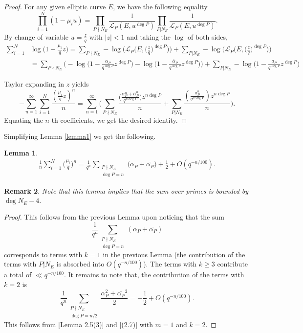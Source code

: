 \documentclass[12pt,reqno]{amsart}
\newcommand{\CL}{\mathcal{L}}
\newtheorem{lem}{Lemma}[subsection]
\newtheorem{rem}[lem]{Remark}
\begin{document}
\begin{proof}
    For any given elliptic curve $E$, we have the following equality
$$ 
\prod_{i=1}^{N} (1-\mu_i u) = \prod_{P \nmid N_E} \frac{1}{\mathcal{L}_P(E,u^{\deg P})} \prod_{P | N_E} \frac{1}{\mathcal{L}_P(E,u^{\deg P})}.
$$
By change of variable $u=\frac{z}{q}$ with $|z| < 1$ and taking the $\log$ of both sides, 
\begin{align*}
\sum\limits_{i=1}^{N} &\log \Big (1- \frac{\mu_i}{q} z \Big ) = \sum_{P \nmid N_E} -\log \Big (\CL_{P} \Big (E,\Big ( \frac{z}{q} \Big )^{\deg P} \Big ) \Big) + \sum_{P | N_E} - \log \Big (\CL_{P} \Big ( E, \Big( \frac{z}{q} \Big) ^{\deg P} \Big) \Big ) \\
&= \sum_{P \nmid N_E} \Big ( -\log \Big (1-\frac{\alpha_{P}}{q^{\deg P}} z^{\deg P} \Big ) - \log \Big ( 1-\frac{\overline{\alpha}_{P}}{q^{\deg P}} z^{\deg P} \Big) \Big) + \sum_{P | N_E} -\log \Big ( 1- \frac{a_P}{q^{\deg P}} z^{\deg P} \Big )
\end{align*}

Taylor expanding in $z$ yields
$$
- \sum\limits_{n=1}^{\infty} \sum\limits_{i=1}^{N} \frac{(\frac{\mu_i}{q} z)^n}{n} =   \sum\limits_{n=1}^{\infty} \Big ( \sum_{P \nmid N_E} \frac{ \Big ( \frac{\alpha_{P}^n + \overline{\alpha}_{P}^n}{q^{n\deg P}} \Big ) z^{n\deg P}} {n} + \sum_{P | N_E} \frac{ (\frac{a_{P}^n}{q^{n\deg P}}) z^{n\deg P}}{n} \Big ). 
$$
Equating the $n$-th coefficients, we get the desired identity.
\end{proof}

Simplifying Lemma \ref{lemma1} we get the following. 


\begin{lem}\label{bounding}
    \begin{align}\label{nthcoefficiets}
\frac{1}{n}\sum\limits_{i=1}^{N} \Big ( \frac{\mu_i}{q} \Big )^n =  \frac{1}{q^n} \sum_{\substack{P \nmid N_E \\ \deg P = n}} \Big (\alpha_P + \overline{\alpha_P} \Big ) + \frac{1}{2} + O(q^{-n / 100}).
\end{align}
\end{lem}
\begin{rem}
Note that this lemma implies that the sum over primes is bounded by $\deg N_E - 4.$
\end{rem}
\begin{proof}
This follows from the previous Lemma upon noticing that the sum 
$$
\frac{1}{q^n}\sum_{\substack{P \nmid N_E \\ \deg P = n}} (\alpha_P + \overline{\alpha_P})
$$
corresponds to terms with $k = 1$ in the previous Lemma (the contribution of the terms with $P | N_E$ is absorbed into $O(q^{-n/100})$). The terms with $k \geq 3$ contribute a total of $\ll q^{-n / 100}$. It remains to note that, the contribution of the terms with $k = 2$ is
$$
\frac{1}{q^n}\sum_{\substack{P \nmid N_E \\ \deg P = n / 2}} \frac{\alpha_P^2 + \overline{\alpha_P}^2}
{2} = - \frac{1}{2} + O(q^{-n / 100}).$$
This follows from \cite{MR4471523}[Lemma 2.5(3)] and \cite{MR4471523}[(2.7)] with $m=1$ and $k=2.$
\end{proof}
\end{document}
